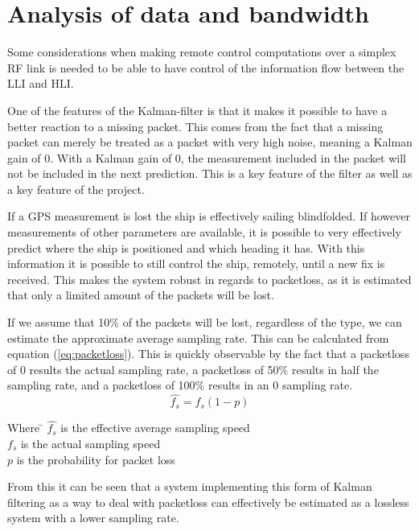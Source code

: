 \section{Analysis of data and bandwidth}
\label{sec:PacketLoss}
Some considerations when making remote control computations over a simplex \ac{RF} link is needed to be able to have control of the information flow between the \ac{LLI} and \ac{HLI}. 


One of the features of the Kalman-filter is that it makes it possible to have a better reaction to a missing packet. This comes from the fact that a missing packet can merely be treated as a packet with very high noise, meaning a Kalman gain of 0. With a Kalman gain of 0, the measurement included in the packet will not be included in the next prediction. This is a key feature of the filter as well as a key feature of the project.

If a \ac{GPS} measurement is lost the ship is effectively sailing blindfolded. If however measurements of other parameters are available, it is possible to very effectively predict where the ship is positioned and which heading it has. With this information it is possible to still control the ship, remotely, until a new fix is received. This makes the system robust in regards to packetloss, as it is estimated that only a limited amount of the packets will be lost. 

If we assume that 10$\%$ of the packets will be lost, regardless of the type, we can estimate the approximate average sampling rate. This can be calculated from equation (\ref{eq:packetloss}). This is quickly observable by the fact that a packetloss of 0 results the actual sampling rate, a packetloss of 50$\%$ results in half the sampling rate, and a packetloss of 100$\%$ results in an 0 sampling rate.
\begin{equation}
\hat{f_s} = f_s(1-p)
\label{eq:packetloss}
\end{equation}

\begin{tabbing}
Where \= $\hat{f_s}$ is the effective average sampling speed\\
\> $f_s$ is the actual sampling speed\\
\> $p$ is the probability for packet loss
\end{tabbing}
From this it can be seen that a system implementing this form of Kalman filtering as a way to deal with packetloss can effectively be estimated as a lossless system with a lower sampling rate.

